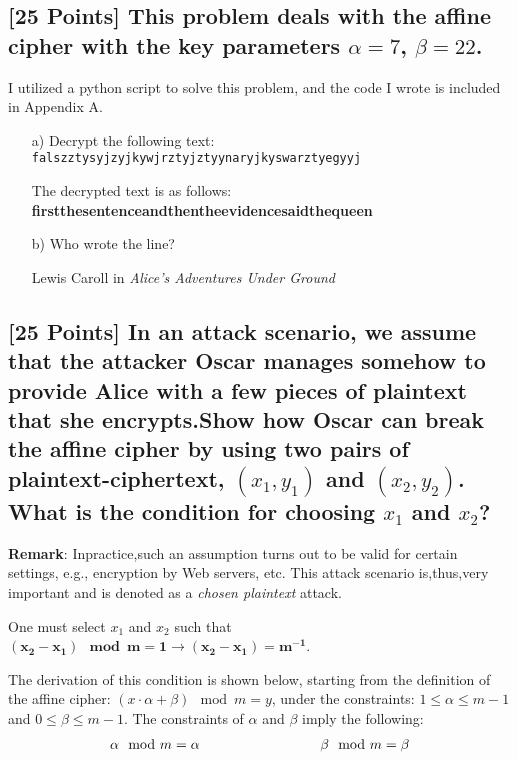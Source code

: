 \documentclass{article}
\begin{document}
\subsection{[25 Points] This problem deals with the affine cipher with the key parameters $\alpha = 7$, $\beta = 22$.}
I utilized a python script to solve this problem, and the code I wrote is included in Appendix A.
\begin{enumerate}
    \setlength{\itemsep}{10pt}%
    \item[a)] Decrypt the following text: \texttt{falszztysyjzyjkywjrztyjztyynaryjkyswarztyegyyj}
    
    The decrypted text is as follows:  \textbf{firstthesentenceandthentheevidencesaidthequeen}
    \item[b)] Who wrote the line?
    
    Lewis Caroll in \textit{Alice's Adventures Under Ground}
    \item[]
\end{enumerate}

\setcounter{subsection}{12}
\newpage
\subsection{[25 Points] In an attack scenario, we assume that the attacker Oscar manages somehow to provide Alice with a few pieces of plaintext that she encrypts.Show how Oscar can break the affine cipher by using two pairs of plaintext-ciphertext, $(x_1 ,y_1)$ and $(x_2 ,y_2)$. What is the condition for choosing $x_1$ and $x_2$?}

\textbf{Remark}:  Inpractice,such an assumption turns out to be valid for certain settings, e.g., encryption by Web servers, etc. This attack scenario is,thus,very important and is denoted as a \emph{chosen plaintext} attack.
\vspace{.5 cm}

One must select $x_1$ and $x_2$ such that $\mathbf{(x_2 - x_1) \mod m = 1 \rightarrow (x_2 - x_1) = m^{-1}}$.

The derivation of this condition is shown below, starting from the definition of the affine cipher: $(x \cdot \alpha + \beta) \mod m = y$, under the constraints: $1 \leq \alpha \leq m-1$ and $0 \leq \beta \leq m-1$.  
The constraints of $\alpha$ and $\beta$ imply the following:
\begin{align*}
\alpha \mod m = \alpha \hspace{.25\textwidth} \beta \mod m = \beta 
\end{align*}
\end{document}
